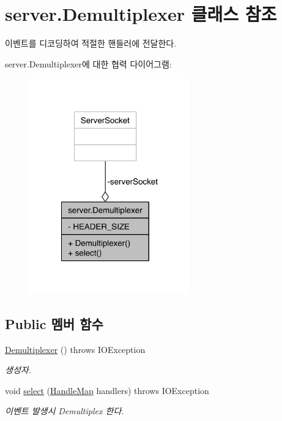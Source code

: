 \hypertarget{classserver_1_1_demultiplexer}{\section{server.\-Demultiplexer 클래스 참조}
\label{classserver_1_1_demultiplexer}
}


이벤트를 디코딩하여 적절한 핸들러에 전달한다.  




server.\-Demultiplexer에 대한 협력 다이어그램\-:\nopagebreak
\begin{figure}[H]
\begin{center}
\leavevmode
\includegraphics[width=197pt]{classserver_1_1_demultiplexer__coll__graph}
\end{center}
\end{figure}
\subsection*{Public 멤버 함수}
\begin{DoxyCompactItemize}
\item 
\hyperlink{classserver_1_1_demultiplexer_a29f6adc4249c7e6603c84821ba994159}{Demultiplexer} ()  throws I\-O\-Exception 
\begin{DoxyCompactList}\small\item\em 생성자. \end{DoxyCompactList}\item 
void \hyperlink{classserver_1_1_demultiplexer_ac73b7d090155c7ef0112ea3718162a13}{select} (\hyperlink{classserver_1_1_handle_map}{Handle\-Map} handlers)  throws I\-O\-Exception 
\begin{DoxyCompactList}\small\item\em 이벤트 발생시 Demultiplex 한다. \end{DoxyCompactList}\end{DoxyCompactItemize}

